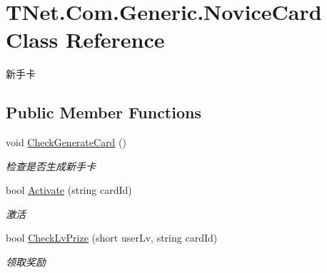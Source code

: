 \hypertarget{class_t_net_1_1_com_1_1_generic_1_1_novice_card}{}\section{T\+Net.\+Com.\+Generic.\+Novice\+Card Class Reference}
\label{class_t_net_1_1_com_1_1_generic_1_1_novice_card}


新手卡  


\subsection*{Public Member Functions}
\begin{DoxyCompactItemize}
\item 
void \mbox{\hyperlink{class_t_net_1_1_com_1_1_generic_1_1_novice_card_a589481260d0da4cc4c0021767c065405}{Check\+Generate\+Card}} ()
\begin{DoxyCompactList}\small\item\em 检查是否生成新手卡 \end{DoxyCompactList}\item 
bool \mbox{\hyperlink{class_t_net_1_1_com_1_1_generic_1_1_novice_card_a753787e657ffed35df4ed30aab904a71}{Activate}} (string card\+Id)
\begin{DoxyCompactList}\small\item\em 激活 \end{DoxyCompactList}\item 
bool \mbox{\hyperlink{class_t_net_1_1_com_1_1_generic_1_1_novice_card_a359744065cd2cf4ed1d8e9253ed81207}{Check\+Lv\+Prize}} (short user\+Lv, string card\+Id)
\begin{DoxyCompactList}\small\item\em 领取奖励 \end{DoxyCompactList}\end{DoxyCompactItemize}
